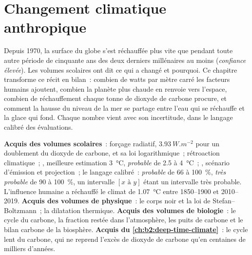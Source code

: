 \chapter{Changement climatique anthropique}\label{ch:b2:anthropogenic-climate-change}

Depuis 1970, la surface du globe s'est réchauffée plus vite que pendant toute autre période de cinquante ans
des deux derniers millénaires au moins (\emph{confiance élevée}). Les volumes scolaires ont dit ce qui a changé
et pourquoi. Ce chapitre transforme ce récit en bilan~: combien de watts par mètre carré les facteurs humains
ajoutent, combien la planète plus chaude en renvoie vers l'espace, combien de réchauffement chaque tonne de
dioxyde de carbone procure, et comment la hausse du niveau de la mer se partage entre l'eau qui se réchauffe et
la glace qui fond. Chaque nombre vient avec son incertitude, dans le langage calibré des évaluations.

\begin{recall}
\textbf{Acquis des volumes scolaires}~: forçage radiatif, $\qty{3.93}{W.m^{-2}}$ pour un doublement du dioxyde
de carbone, et sa loi logarithmique~; rétroaction climatique~; , meilleure
estimation \qty{3}{\celsius}, \emph{probable} de 2.5 à \qty{4}{\celsius}~; , scénario d'émission et
projection~; le langage calibré~: \emph{probable} de 66 à \qty{100}{\percent}, \emph{très probable} de 90 à
\qty{100}{\percent}, un intervalle $[x \text{ à } y]$ étant un intervalle très probable. L'influence humaine a
réchauffé le climat de \qty{1.07}{\celsius} entre 1850--1900 et 2010--2019. \textbf{Acquis des volumes de
physique}~: le corps noir et la loi de Stefan--Boltzmann~; la dilatation thermique. \textbf{Acquis des volumes
de biologie}~: le cycle du carbone, la fraction restée dans l'atmosphère, les puits de carbone et le bilan
carbone de la biosphère. \textbf{Acquis du \cref{ch:b2:deep-time-climate}}~: le cycle lent du
carbone, qui ne reprend l'excès de dioxyde de carbone qu'en centaines de milliers d'années.
\end{recall}

